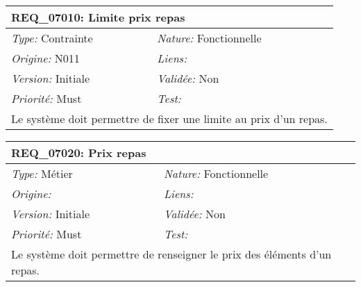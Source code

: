 \begin{table}[!h]

\begin{tabular}{|p{60mm}p{100mm}|}

\hline

\multicolumn{2}{|l|}{\textbf{REQ\_07010:} Limite prix repas} \\ \hline

\emph{Type:} Contrainte & \emph{Nature:} Fonctionnelle \\

\emph{Origine:} N011 & \emph{Liens:}  \\

\emph{Version:} Initiale & \emph{Validée:} Non \\

\emph{Priorité:} Must & \emph{Test:} \\ \hline

\multicolumn{2}{|p{16cm}|}{Le système doit permettre de fixer une limite au prix d'un repas.} \\ \hline

\end{tabular}

\end{table}



\begin{table}[!h]

\begin{tabular}{|p{60mm}p{100mm}|}

\hline

\multicolumn{2}{|l|}{\textbf{REQ\_07020:} Prix repas} \\ \hline

\emph{Type:} Métier & \emph{Nature:} Fonctionnelle \\

\emph{Origine:}  & \emph{Liens:}  \\

\emph{Version:} Initiale & \emph{Validée:} Non \\

\emph{Priorité:} Must & \emph{Test:} \\ \hline

\multicolumn{2}{|p{16cm}|}{Le système doit permettre de renseigner le prix des éléments d'un repas.} \\ \hline

\end{tabular}

\end{table}



